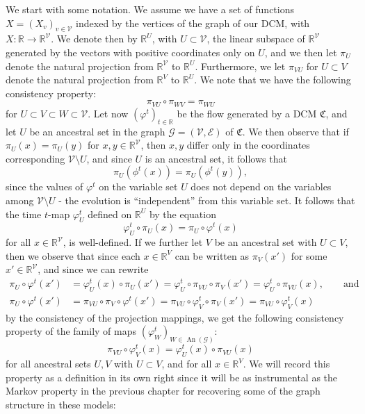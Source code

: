 \documentclass[11pt, a4paper]{memoir}
\theoremstyle{break}
\theoremstyle{break}
\theoremstyle{nonumberplain}
\newcommand{\mR}{\mathbb{R}}
\DeclareMathOperator{\an}{An}
\begin{document}
We start with some notation. We assume we have a set of functions $X=(X_v)_{v\in \mathcal{V}}$ indexed by the vertices of the graph of our DCM, with $X:\mR\to\mR^\mathcal{V}$. We denote then by $\mR^U$, with $U\subset \mathcal{V}$, the linear subspace of $\mR^{\mathcal{V}}$ generated by the vectors with positive coordinates only on $U$, and we then let $\pi_{U}$ denote the natural projection from $\mR^{\mathcal{V}}$ to $\mR^{U}$. Furthermore, we let $\pi_{VU}$ for $U\subset V$ denote the natural projection from $\mR^V$ to $\mR^U$. We note that we have the following consistency property:
$$\pi_{VU}\circ \pi_{WV}=\pi_{WU}$$
for $U\subset V\subset W\subset\mathcal{V}$. Let now $(\varphi^t)_{t\in \mR}$ be the flow generated by a DCM $\mathfrak{C}$, and let $U$ be an ancestral set in the graph $\mathcal{G}=(\mathcal{V},\mathcal{E})$ of $\mathfrak{C}$. We then observe that if $\pi_U(x)=\pi_U(y)$ for $x,y\in \mR^\mathcal{V}$, then $x,y$ differ only in the coordinates corresponding $\mathcal{V}\setminus U$, and since $U$ is an ancestral set, it follows that $$\pi_U(\phi^t(x))=\pi_U(\phi^t(y)),$$
since the values of $\varphi^t$ on the variable set $U$ does not depend on the variables among $\mathcal{V}\setminus U$ - the evolution is \enquote{independent} from this variable set. It follows that the time $t$-map $\varphi_U^t$ defined on $\mR^U$ by the equation
$$\varphi^t_U\circ\pi_U(x)=\pi_U\circ \varphi^t(x)$$
for all $x\in \mR^{\mathcal{V}}$, is well-defined. If we further let $V$ be an ancestral set with $U\subset V$, then we observe that since each $x\in \mR^V$ can be written as $\pi_V(x')$ for some $x'\in \mR^{\mathcal{V}}$, and since we can rewrite
\begin{align*}
\pi_U\circ\varphi^t(x')
&=\varphi_U^t(x)\circ\pi_U(x')=
\varphi_U^t\circ\pi_{VU}\circ\pi_V(x')=\varphi_U^t\circ\pi_{VU}(x),\quad\quad \text{and}\\
\pi_U\circ\varphi^t(x')&=\pi_{VU}\circ \pi_V\circ\varphi^t(x')=\pi_{VU}\circ \varphi_V^t\circ \pi_V(x')=\pi_{VU}\circ\varphi_V^t(x)
\end{align*}
by the consistency of the projection mappings, we get the following consistency property of the family of maps $(\varphi_W^{t})_{W\in \an(\mathcal{G})}$:
$$\pi_{VU}\circ \varphi_V^t(x)=\varphi_U^t(x)\circ\pi_{VU}(x)$$
for all ancestral sets $U,V$ with $U\subset V$, and for all $x\in \mR^V$. We will record this property as a definition in its own right since it will be as instrumental as the Markov property in the previous chapter for recovering some of the graph structure in these models:
\end{document}
